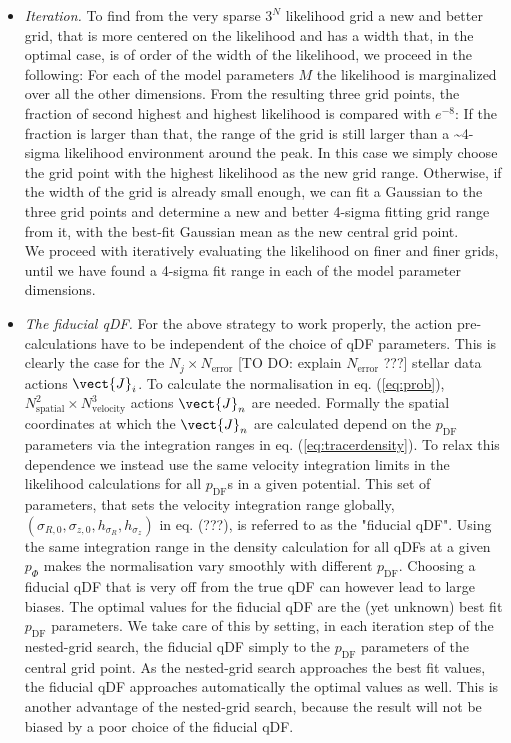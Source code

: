 \begin{itemize}
\item \emph{Iteration.} To find from the very sparse $3^N$ likelihood grid a new and better grid, that is more centered on the likelihood and has a width that, in the optimal case, is of order of the width of the likelihood, we proceed in the following: For each of the model parameters $M$ the likelihood is marginalized over all the other dimensions. From the resulting three grid points, the fraction of second highest and highest likelihood is compared with $e^{-8}$: If the fraction is larger than that, the range of the grid is still larger than a \textasciitilde 4-sigma likelihood environment around the peak. In this case we simply choose the grid point with the highest likelihood as the new grid range. Otherwise, if the width of the grid is already small enough, we can fit a Gaussian to the three grid points and determine a new and better 4-sigma fitting grid range from it, with the best-fit Gaussian mean as the new central grid point. 
\\We proceed with iteratively evaluating the likelihood on finer and finer grids, until we have found a 4-sigma fit range in each of the model parameter dimensions.

\item \emph{The fiducial qDF.} For the above strategy to work properly, the action pre-calculations have to be independent of the choice of qDF parameters. This is clearly the case for the $N_j \times N_\text{error}$ [TO DO: explain $N_\text{error}$ ???]  stellar data actions $\vect{J}_i$. To calculate the normalisation in eq. (\ref{eq:prob}), $N_\text{spatial}^2 \times N_\text{velocity}^3$ actions $\vect{J}_n$ are needed. Formally the spatial coordinates at which the $\vect{J}_n$ are calculated depend on the $p_\text{DF}$ parameters via the integration ranges in eq. (\ref{eq:tracerdensity}). To relax this dependence we instead use the same velocity integration limits in the likelihood calculations for all $p_\text{DF}$s in a given potential. This set of parameters, that sets the velocity integration range globally, $(\sigma_{R,0},\sigma_{z,0},h_{\sigma_R},h_{\sigma_z})$ in eq. (???), is referred to as the "fiducial qDF". Using the same integration range in the density calculation for all qDFs at a given $p_\Phi$ makes the normalisation vary smoothly with different $p_\text{DF}$. Choosing a fiducial qDF that is very off from the true qDF can however lead to large biases. The optimal values for the fiducial qDF are the (yet unknown) best fit $p_\text{DF}$ parameters. We take care of this by setting, in each iteration step of the nested-grid search, the fiducial qDF simply to the $p_\text{DF}$ parameters of the central grid point.  As the nested-grid search approaches the best fit values, the fiducial qDF approaches automatically the optimal values as well. This is another advantage of the nested-grid search, because the result will not be biased by a poor choice of the fiducial qDF.


\end{itemize}
